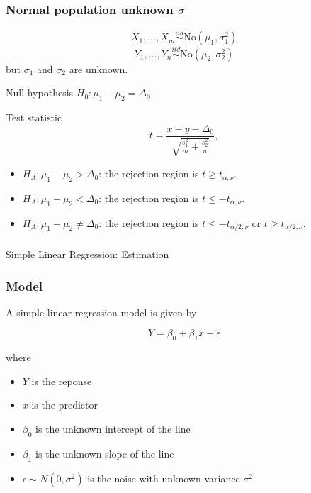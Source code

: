 \begin{frame}[fragile]\frametitle{Normal population unknown $\sigma$}

{\tiny

$$X_1,...,X_m \stackrel{iid}{\sim} \mbox{No}(\mu_1,\sigma_1^2)$$
$$Y_1,...,Y_n \stackrel{iid}{\sim} \mbox{No}(\mu_2,\sigma_2^2)$$
but $\sigma_1$ and $\sigma_2$ are unknown.

Null hypothesis $H_0: \mu_1 - \mu_2 = \Delta_0 $.

Test statistic $$t = \frac{\bar{x}-\bar{y}-\Delta_0}{\sqrt{\frac{s_1^2}{m}+\frac{s_2^2}{n}}},$$

\begin{itemize}

\item $H_A: \mu_1 - \mu_2 > \Delta_0$: the rejection region is $t \geq t_{\alpha,\nu}$.
\item $H_A: \mu_1- \mu_2 < \Delta_0$: the rejection region is $t \leq -t_{\alpha,\nu}$.
\item $H_A: \mu_1- \mu_2 \neq \Delta_0$: the rejection region is $t \leq
  -t_{\alpha/2,\nu}$ or $t \geq t_{\alpha/2,\nu}$.

\end{itemize}
}

\end{frame}


\begin{frame}[fragile]\frametitle{}
\begin{center}
{\Large Simple Linear Regression: Estimation}

\end{center}
\end{frame}


\begin{frame}[fragile]\frametitle{Model}

A simple linear regression model is given by

\begin{displaymath}
Y = \beta_{0}+\beta_{1}x+\epsilon
\end{displaymath}

where
\begin{itemize}
\item $Y$ is the reponse
\item $x$ is the predictor
\item $\beta_{0}$ is the unknown intercept of the line 
\item $\beta_{1}$ is the unknown slope of the line
\item $\epsilon\sim N(0,\sigma^{2})$ is the noise with unknown variance $\sigma^{2}$
\end{itemize}
\end{frame}

